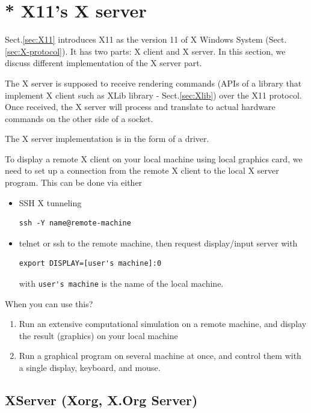 \section{ * X11's X server}
\label{sec:X-server-implementation}

Sect.\ref{sec:X11} introduces X11 as the version 11 of X Windows System
(Sect.\ref{sec:X-protocol}). It has two parts: X client and X server. In this
section, we discuss different implementation of the X server part.

The X server is supposed to receive rendering commands (APIs of a library
that implement X client such as XLib library - Sect.\ref{sec:Xlib}) over the X11
protocol. Once received,  the X server will process and translate to actual
hardware commands on the other side of a socket.

The X server implementation is in the form of a driver.

To display a remote X client on your local machine using local graphics card, we
need to set up a connection from the remote X client to the local X server
program. This can be done via either
\begin{itemize}
  \item SSH X tunneling
\begin{verbatim}
ssh -Y name@remote-machine
\end{verbatim}
  \item telnet or ssh to the remote machine, then request
    display/input server with 
\begin{verbatim}
export DISPLAY=[user's machine]:0
\end{verbatim}
with \verb!user's machine! is the name of the local machine. 
  \end{itemize}
  When you can use this?
  \begin{enumerate}
  \item Run an extensive computational simulation on a remote machine,
    and display the result (graphics) on your local machine
  \item Run a graphical program on several machine at once, and
    control them with a single display, keyboard, and mouse. 
\end{enumerate}


\subsection{XServer (Xorg, X.Org Server)}
\label{sec:XServer}
\label{sec:X.org}
\label{sec:Xorg}
\label{sec:X11R7.0}

